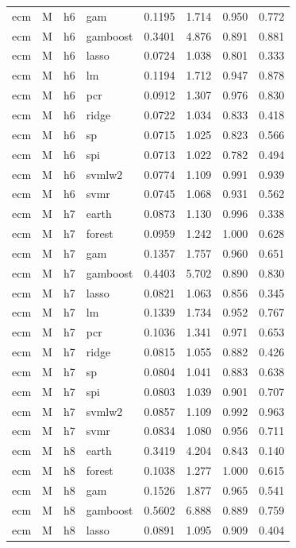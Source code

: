 \begin{ThreePartTable}
\begin{longtable}[t]{llclcccc}
ecm & M & h6 & gam & 0.1195 & 1.714 & 0.950 & 0.772\\
ecm & M & h6 & gamboost & 0.3401 & 4.876 & 0.891 & 0.881\\
ecm & M & h6 & lasso & 0.0724 & 1.038 & 0.801 & 0.333\\
ecm & M & h6 & lm & 0.1194 & 1.712 & 0.947 & 0.878\\
ecm & M & h6 & pcr & 0.0912 & 1.307 & 0.976 & 0.830\\
ecm & M & h6 & ridge & 0.0722 & 1.034 & 0.833 & 0.418\\
ecm & M & h6 & sp & 0.0715 & 1.025 & 0.823 & 0.566\\
ecm & M & h6 & spi & 0.0713 & 1.022 & 0.782 & 0.494\\
ecm & M & h6 & svmlw2 & 0.0774 & 1.109 & 0.991 & 0.939\\
ecm & M & h6 & svmr & 0.0745 & 1.068 & 0.931 & 0.562\\
\addlinespace
ecm & M & h7 & earth & 0.0873 & 1.130 & 0.996 & 0.338\\
ecm & M & h7 & forest & 0.0959 & 1.242 & 1.000 & 0.628\\
ecm & M & h7 & gam & 0.1357 & 1.757 & 0.960 & 0.651\\
ecm & M & h7 & gamboost & 0.4403 & 5.702 & 0.890 & 0.830\\
ecm & M & h7 & lasso & 0.0821 & 1.063 & 0.856 & 0.345\\
ecm & M & h7 & lm & 0.1339 & 1.734 & 0.952 & 0.767\\
ecm & M & h7 & pcr & 0.1036 & 1.341 & 0.971 & 0.653\\
ecm & M & h7 & ridge & 0.0815 & 1.055 & 0.882 & 0.426\\
ecm & M & h7 & sp & 0.0804 & 1.041 & 0.883 & 0.638\\
ecm & M & h7 & spi & 0.0803 & 1.039 & 0.901 & 0.707\\
ecm & M & h7 & svmlw2 & 0.0857 & 1.109 & 0.992 & 0.963\\
ecm & M & h7 & svmr & 0.0834 & 1.080 & 0.956 & 0.711\\
\addlinespace
ecm & M & h8 & earth & 0.3419 & 4.204 & 0.843 & 0.140\\
ecm & M & h8 & forest & 0.1038 & 1.277 & 1.000 & 0.615\\
ecm & M & h8 & gam & 0.1526 & 1.877 & 0.965 & 0.541\\
ecm & M & h8 & gamboost & 0.5602 & 6.888 & 0.889 & 0.759\\
ecm & M & h8 & lasso & 0.0891 & 1.095 & 0.909 & 0.404\\

\end{longtable}
\end{ThreePartTable}
